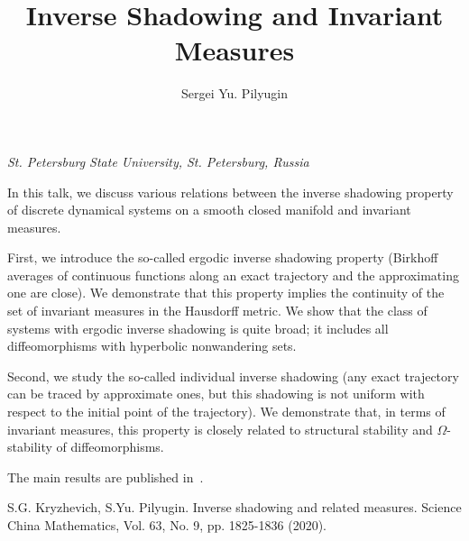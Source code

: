 \documentclass[12pt]{article}
\title{\bf\Large Inverse Shadowing and Invariant Measures}
\author{Sergei Yu. Pilyugin}
\date{}
\begin{document}
\begin{center}
	\maketitle
	{\large\textit{St. Petersburg State University, St. Petersburg, Russia}}
\end{center}


In this talk, we discuss various relations between the inverse
shadowing property of discrete dynamical systems on a smooth
closed manifold and invariant measures.

First, we introduce the so-called ergodic inverse shadowing property (Birk\-hoff
averages of continuous functions along an exact trajectory and the approximating 
one are close). We demonstrate that this property implies the continuity of the set of invariant measures in the Hausdorff metric. We show that the class of systems 
with ergodic inverse shadowing is quite broad; it includes all diffeomorphisms 
with hyperbolic nonwandering sets. 

Second, we study the so-called individual inverse shadowing 
(any exact trajectory can be traced by approximate ones, but this 
shadowing is not uniform with respect to the initial point of the trajectory).
We demonstrate that, in terms of invariant measures,
this property is closely related to structural stability 
and $\Omega$-stability of diffeomorphisms.

The main results are published in~\cite{KP}.

\begin{thebibliography}{99}
	 S.G. Kryzhevich, S.Yu. Pilyugin.  Inverse shadowing and related measures. Science China Mathematics, Vol. 63, No. 9, pp. 1825-1836 (2020). 
\end{thebibliography}
\end{document}
